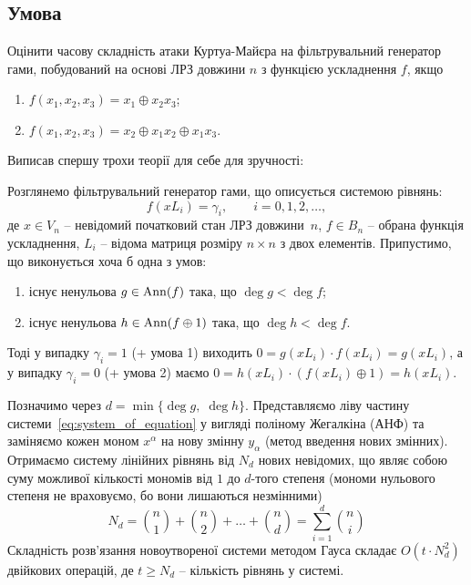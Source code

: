 \chapter{}
\label{chap:3}

\section{Умова}

Оцінити часову складність атаки Куртуа-Майєра на фільтрувальний генератор
гами, побудований на основі ЛРЗ довжини $n$ з функцією ускладнення $f$, якщо
\begin{enumerate}[label=\alph*)]
    \item $f(x_{1}, x_{2}, x_{3}) = x_{1} \oplus x_{2}x_{3}$;
    \item $f(x_{1}, x_{2}, x_{3}) = x_{2} \oplus x_{1}x_{2} \oplus x_{1}x_{3}$.
\end{enumerate}

Виписав спершу трохи теорії для себе для зручності:

Розглянемо фільтрувальний генератор гами, що описується системою рівнянь:
\begin{equation}
    \label{eq:system_of_equation}
    f(xL_i) = \gamma_i, \qquad i = 0, 1, 2, \ldots,
\end{equation}
де $x \in V_{n}$ -- невідомий початковий стан ЛРЗ довжини~$n$, $f \in B_n$ -- обрана функція ускладнення, 
$L_{i}$ -- відома матриця розміру $n \times n$ з двох елементів. Припустимо, що виконується хоча б одна з умов:
\begin{enumerate}[leftmargin=2em]
    \item існує ненульова $g \in \operatorname{Ann}(f)$ така, що $\deg g < \deg f$;
    \item існує ненульова $h \in \operatorname{Ann}(f \oplus 1)$ така, що $\deg h < \deg f$.
\end{enumerate}
Тоді у випадку $\gamma_i = 1$ (+ умова 1) виходить $0 = g(xL_i) \cdot f(xL_i) = g(xL_i)$, а у випадку $\gamma_i = 0$ 
(+ умова 2) маємо $0 = h(xL_i) \cdot (f(xL_i) \oplus 1) = h(xL_i)$.

Позначимо через $d = \min\{\deg g,\; \deg h\}$. Представляємо ліву частину системи~\eqref{eq:system_of_equation} у 
вигляді поліному Жегалкіна (АНФ) та заміняємо кожен моном $x^{\alpha}$ на нову змінну $y_{\alpha}$ (метод введення 
нових змінних). Отримаємо систему лінійних рівнянь від $N_{d}$ нових невідомих, що являє собою суму можливої кількості 
мономів від $1$ до $d$-того степеня (мономи нульового степеня не враховуємо, бо вони лишаються незмінними)
\begin{equation*}
    N_{d} = \binom{n}{1} + \binom{n}{2} + \ldots + \binom{n}{d} = \sum\limits_{i=1}^{d} \binom{n}{i}
\end{equation*}
Складність розв'язання новоутвореної системи методом Гауса складає $O(t \cdot N_d^2)$ двійкових операцій, де 
$t \geq N_d$ -- кількість рівнянь у системі.

